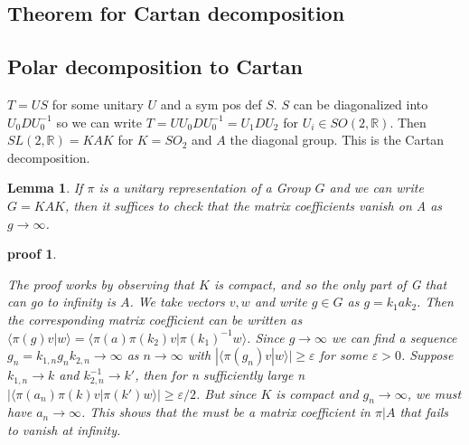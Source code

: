 \documentclass[
]{article}
\theoremstyle{break}
\theoremstyle{plain}
\newtheorem{lem}[thm]{Lemma}
\newtheorem*{pf}{proof}
\begin{document}

\hypertarget{theorem-for-cartan-decomposition}{%
\subsection{Theorem for Cartan
decomposition}\label{theorem-for-cartan-decomposition}}

\hypertarget{polar-decomposition-to-cartan}{%
\subsection{Polar decomposition to
Cartan}\label{polar-decomposition-to-cartan}}

$T = US$ for some unitary $U$ and a sym pos def $S$. $S$ can be
diagonalized into $U_0 D U_0^{-1}$ so we can write
$T = U U_0 D U_0^{-1} = U_1 D U_2$ for $U_i \in SO(2, \mathbb{R})$.
Then $SL(2, \mathbb{R}) = KAK$ for $K = SO_2$ and $A$ the diagonal
group. This is the Cartan decomposition.





\begin{lem}\label{lemma}
If $\pi$ is a unitary representation of a Group $G$ and we can write
$G = KAK$, then it suffices to check that the matrix coefficients
vanish on A as $g \rightarrow \infty$.
\end{lem}

\begin{pf}\label{pf:lemma}

The proof works by observing that $K$ is compact, and so the only part
of G that can go to infinity is $A$. We take vectors $v, w$ and
write $g \in G$ as $g = k_1 a k_2$. Then the corresponding matrix
coefficient can be written as
$\langle \pi(g)v|w \rangle = \langle \pi(a) \pi(k_2) v | \pi(k_1)^{-1} w \rangle$.
Since $g \rightarrow \infty$ we can find a sequence
$g_n = k_{1,n} g_{n} k_{2,n} \rightarrow \infty$ as
$n \rightarrow \infty$ with
$|\langle \pi(g_n) v | w \rangle | \geq \varepsilon$ for some
$\varepsilon > 0$. Suppose $k_{1,n} \rightarrow k$ and
$k_{2,n}^{-1} \rightarrow k'$, then for n sufficiently large n
$|\langle \pi(a_n)\pi(k)v | \pi(k') w \rangle | \geq \varepsilon/2$.
But since $K$ is compact and $g_n \rightarrow \infty$, we must have
$a_n \rightarrow \infty$. This shows that the must be a matrix
coefficient in $\pi | A$ that fails to vanish at infinity.

\end{pf}
\end{document}
